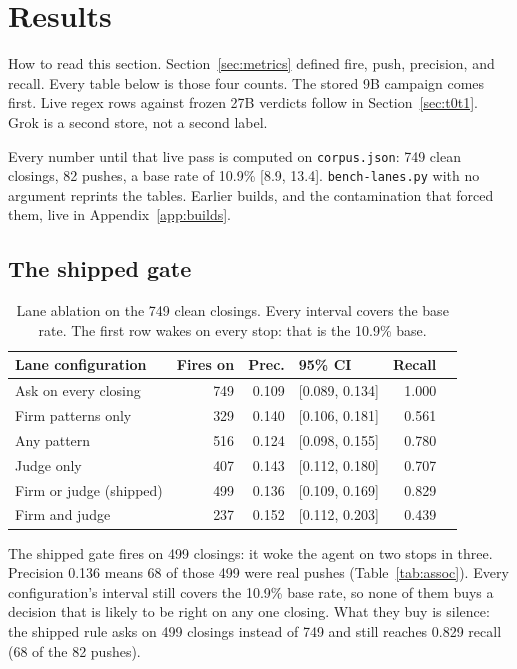 \section{Results}
\label{sec:results}

How to read this section. Section~\ref{sec:metrics} defined fire, push,
precision, and recall. Every table below is those four counts. The stored
9B campaign comes first. Live regex rows against frozen 27B verdicts
follow in Section~\ref{sec:t0t1}. Grok is a second store, not a second
label.

Every number until that live pass is computed on \texttt{corpus.json}:
749 clean closings, 82 pushes, a base rate of 10.9\% [8.9, 13.4].
\texttt{bench-lanes.py} with no argument reprints the tables. Earlier
builds, and the contamination that forced them, live in
Appendix~\ref{app:builds}.

\subsection{The shipped gate}

\begin{table}[ht]
\centering
\begin{tabular}{lrrlrr}
\toprule
Lane configuration & Fires on & Prec. & 95\% CI & Recall \\
\midrule
Ask on every closing & 749 & 0.109 & [0.089, 0.134] & 1.000 \\
\midrule
Firm patterns only & 329 & 0.140 & [0.106, 0.181] & 0.561 \\
Any pattern & 516 & 0.124 & [0.098, 0.155] & 0.780 \\
Judge only & 407 & 0.143 & [0.112, 0.180] & 0.707 \\
Firm or judge (shipped) & 499 & 0.136 & [0.109, 0.169] & 0.829 \\
Firm and judge & 237 & 0.152 & [0.112, 0.203] & 0.439 \\
\bottomrule
\end{tabular}
\caption{Lane ablation on the 749 clean closings. Every interval covers the
base rate. The first row wakes on every stop: that is the 10.9\% base.}
\label{tab:lanes}
\end{table}

The shipped gate fires on 499 closings: it woke the agent on two stops
in three. Precision 0.136 means 68 of those 499 were real pushes
(Table~\ref{tab:assoc}). Every configuration's interval still covers the
10.9\% base rate, so none of them buys a decision that is likely to be
right on any one closing. What they buy is silence: the shipped rule
asks on 499 closings instead of 749 and still reaches 0.829 recall
(68 of the 82 pushes).

